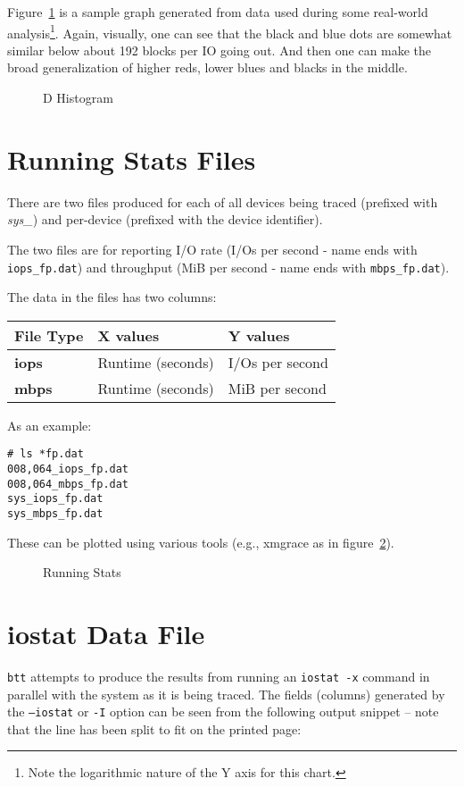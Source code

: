 \documentclass{article}
\begin{document}
  Figure~\ref{fig:dhist} is a sample graph generated from data used during
  some real-world analysis\footnote{Note the logarithmic nature of the
  Y axis for this chart.}. Again, visually, one can see that the black
  and blue dots are somewhat similar below about 192 blocks per IO going
  out. And then one can make the broad generalization of higher reds,
  lower blues and blacks in the middle.

  \begin{figure}[hb]
  \leavevmode\centering
  \caption{\label{fig:dhist}D Histogram}
  \end{figure}

\newpage\section{\label{sec:rstat}Running Stats Files}

There are two files produced for each of all devices being traced
(prefixed with \emph{sys\_}) and per-device (prefixed with the device
identifier).

The two files are for reporting I/O rate (I/Os per second - name ends
with \texttt{iops\_fp.dat}) and throughput (MiB per second - name ends
with \texttt{mbps\_fp.dat}).

The data in the files has two columns:\smallskip

\begin{tabular}{lll}
\textbf{File Type} & \textbf{X values} & \textbf{Y values}\\\hline
\textbf{iops} & Runtime (seconds) & I/Os per second\\\hline
\textbf{mbps} & Runtime (seconds) & MiB per second\\\hline
\end{tabular}

As an example:

\begin{verbatim}
# ls *fp.dat
008,064_iops_fp.dat
008,064_mbps_fp.dat
sys_iops_fp.dat
sys_mbps_fp.dat
\end{verbatim}

These can be plotted using various tools (e.g., xmgrace as in
figure~\ref{fig:rstats}).

  \begin{figure}[b!]
  \leavevmode\centering
  \caption{\label{fig:rstats}Running Stats}
  \end{figure}

\newpage\section{\label{sec:iostat}iostat Data File}
  \texttt{btt} attempts to produce the results from running an
  \texttt{iostat -x} command in parallel with the system as it is being
  traced. The fields (columns) generated by the \texttt{--iostat} or
  \texttt{-I} option can be seen from the following output snippet --
  note that the line has been split to fit on the printed page:
\end{document}
